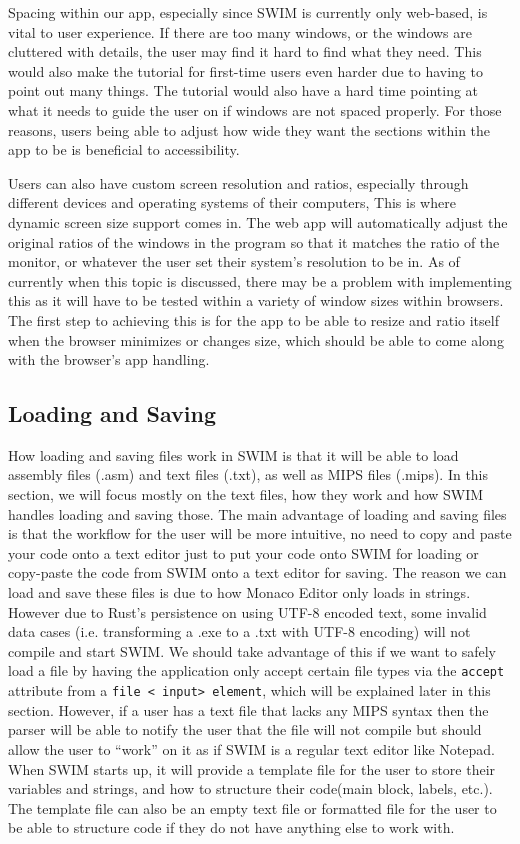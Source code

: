 \documentclass[
    paper=letter,
    parskip=half,
    fontsize=12pt,
    titlepage=firstiscover,
    toc=bibliography,
    numbers=endperiod
]{scrartcl}
\begin{document}
Spacing within our app, especially since SWIM is currently only
web-based, is vital to user experience. If there are too many windows,
or the windows are cluttered with details, the user may find it hard to
find what they need. This would also make the tutorial for first-time
users even harder due to having to point out many things. The tutorial
would also have a hard time pointing at what it needs to guide the user
on if windows are not spaced properly. For those reasons, users being
able to adjust how wide they want the sections within the app to be is
beneficial to accessibility.

Users can also have custom screen resolution and ratios, especially
through different devices and operating systems of their computers, This
is where dynamic screen size support comes in. The web app will
automatically adjust the original ratios of the windows in the program
so that it matches the ratio of the monitor, or whatever the user set
their system's resolution to be in. As of currently when this topic is
discussed, there may be a problem with implementing this as it will have
to be tested within a variety of window sizes within browsers. The first
step to achieving this is for the app to be able to resize and ratio
itself when the browser minimizes or changes size, which should be able
to come along with the browser's app handling.

\subsection{Loading and Saving}

How loading and saving files work in SWIM is that it will be able to
load assembly files (.asm) and text files (.txt), as well as MIPS files
(.mips). In this section, we will focus mostly on the text files, how
they work and how SWIM handles loading and saving those. The main
advantage of loading and saving files is that the workflow for the user
will be more intuitive, no need to copy and paste your code onto a text
editor just to put your code onto SWIM for loading or copy-paste the
code from SWIM onto a text editor for saving. The reason we can load and
save these files is due to how Monaco Editor only loads in strings.
However due to Rust's persistence on using UTF-8 encoded text, some
invalid data cases (i.e. transforming a .exe to a .txt with UTF-8
encoding) will not compile and start SWIM.
We should take advantage of this if we want to safely load a file by
having the application only accept certain file types via the
\texttt{accept} attribute from a \texttt{file \textless
    input\textgreater{} element}, which will be explained later in this
section. However, if a user has a text file that lacks any MIPS syntax
then the parser will be able to notify the user that the file will not
compile but should allow the user to ``work'' on it as if SWIM is a
regular text editor like Notepad. When SWIM starts up, it will provide a
template file for the user to store their variables and strings, and how
to structure their code(main block, labels, etc.). The template file can
also be an empty text file or formatted file for the user to be able to
structure code if they do not have anything else to work with.
\end{document}
